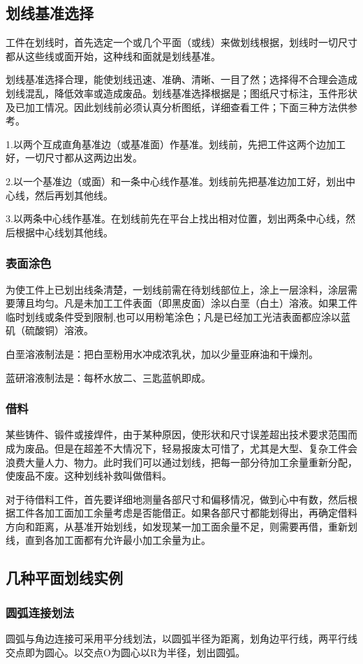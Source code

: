 \documentclass{ctexbook}
\begin{document}
\subsection{划线基准选择}
工件在划线时，首先选定一个或几个平面（或线）来做划线根据，划线时一切尺寸都从这些线或面开始，这种线和面就是划线基准。

划线基准选择合理，能使划线迅速、准确、清晰、一目了然；选择得不合理会造成划线混乱，降低效率或造成废品。划线基准选择根据是；图纸尺寸标注，玉件形状及已加工情况。因此划线前必须认真分析图纸，详细查看工件；下面三种方法供参考。

1.以两个互成直角基准边（或基准面）作基准。划线前，先把工件这两个边加工好，一切尺寸都从这两边出发。

2.以一个基准边（或面）和一条中心线作基准。划线前先把基准边加工好，划出中心线，然后再划其他线。

3.以两条中心线作基准。在划线前先在平台上找出相对位置，划出两条中心线，然后根据中心线划其他线。
\subsubsection{表面涂色}
为使工件上已划出线条清楚，一划线前需在待划线部位上，涂上一层涂料，涂层需要薄且均匀。凡是未加工工件表面（即黑皮面）涂以白垩（白土）溶液。如果工件临时划线或条件受到限制,也可以用粉笔涂色；凡是已经加工光洁表面都应涂以蓝矶（硫酸铜）溶液。

白垩溶液制法是：把白垩粉用水冲成浓乳状，加以少量亚麻油和干燥剂。

蓝研溶液制法是：每杯水放二、三匙蓝帆即成。
\subsubsection{借料}
某些铸件、锻件或接焊件，由于某种原因，使形状和尺寸误差超出技术要求范围而成为废品。但是在超差不大情况下，轻易报废太可惜了，尤其是大型、复杂工件会浪费大量人力、物力。此时我们可以通过划线，把每一部分待加工余量重新分配，使废品不废。这种划线补救叫做借料。

对于待借料工件，首先要详细地测量各部尺寸和偏移情况，做到心中有数，然后根据工件各加工面加工余量考虑是否能借正。如果各部尺寸都能划得出，再确定借料方向和距离，从基准开始划线，如发现某一加工面余量不足，则需要再借，重新划线，直到各加工面都有允许最小加工余量为止。
\subsection{几种平面划线实例}
\subsubsection{圆弧连接划法}
圆弧与角边连接可采用平分线划法，以圆弧半径为距离，划角边平行线，两平行线交点即为圆心。以交点O为圆心以R为半径，划出圆弧。
\end{document}
